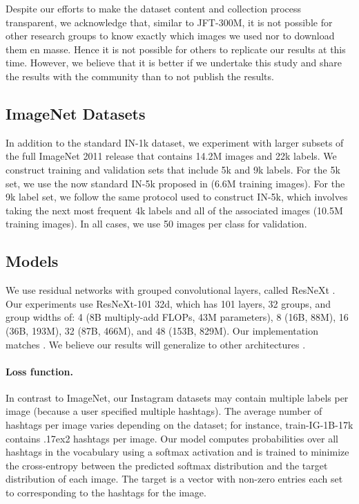 \documentclass[runningheads]{llncs}
\newcommand{\app}{\raise.17ex\hbox{}}
\begin{document}
Despite our efforts to make the dataset content and collection process transparent, we acknowledge that, similar to JFT-300M, it is not possible for other research groups to know exactly which images we used nor to download them en masse. Hence it is not possible for others to replicate our results at this time. However, we believe that it is better if we undertake this study and share the results with the community than to not publish the results.

\subsection{ImageNet Datasets}

In addition to the standard IN-1k dataset, we experiment with larger subsets of the full ImageNet 2011 release that contains 14.2M images and 22k labels. We construct training and validation sets that include 5k and 9k labels. For the 5k set, we use the now standard IN-5k proposed in \cite{xie2017resnext} (6.6M training images). For the 9k label set, we follow the same protocol used to construct IN-5k, which involves taking the next most frequent 4k labels and all of the associated images (10.5M training images). In all cases, we use 50 images per class for validation.

\subsection{Models}
We use residual networks with grouped convolutional layers, called ResNeXt \cite{xie2017resnext}. Our experiments use ResNeXt-101 32d, which has 101 layers, 32 groups, and group widths  of: 4 (8B multiply-add FLOPs, 43M parameters), 8 (16B, 88M), 16 (36B, 193M), 32 (87B, 466M), and 48 (153B, 829M). Our implementation matches \cite{goyal2017accurate}. We believe our results will generalize to other architectures \cite{he2016deep,huang2017densenet,szegedy2016inceptionv4}.

\paragraph{Loss function.} In contrast to ImageNet, our Instagram datasets may contain multiple labels per image (because a user specified multiple hashtags). The average number of hashtags per image varies depending on the dataset; for instance, train-IG-1B-17k contains \app 2 hashtags per image. Our model computes probabilities over all hashtags in the vocabulary using a softmax activation and is trained to minimize the cross-entropy between the predicted softmax distribution and the target distribution of each image. The target is a vector with  non-zero entries each set to  corresponding to the  hashtags for the image.
\end{document}

